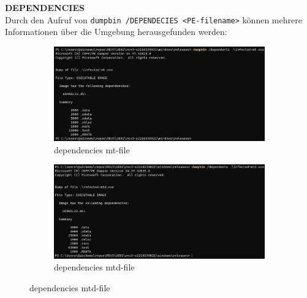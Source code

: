 \documentclass{article}
\begin{document}
	\noindent \textbf{DEPENDENCIES}\\
	Durch den Aufruf von \texttt{dumpbin /DEPENDECIES <PE-filename>} können mehrere Informationen über die Umgebung herausgefunden werden:\\
	\begin{figure}[htp]
		\centering
		\begin{subfigure}[b]{0.45\textwidth}
			\includegraphics[width=\textwidth]{pictures/1. dependencies-mt.png}
			\caption{dependencies mt-file}
			\label{fig:image1}
		\end{subfigure}
		\hfill
		\begin{subfigure}[b]{0.45\textwidth}
			\includegraphics[width=\textwidth]{pictures/1. dependencies-mtd.png}
			\caption{dependencies mtd-file}
			\label{fig:image2}
		\end{subfigure}
		
		\vspace{10pt} %
		

\end{figure}
\end{document}
